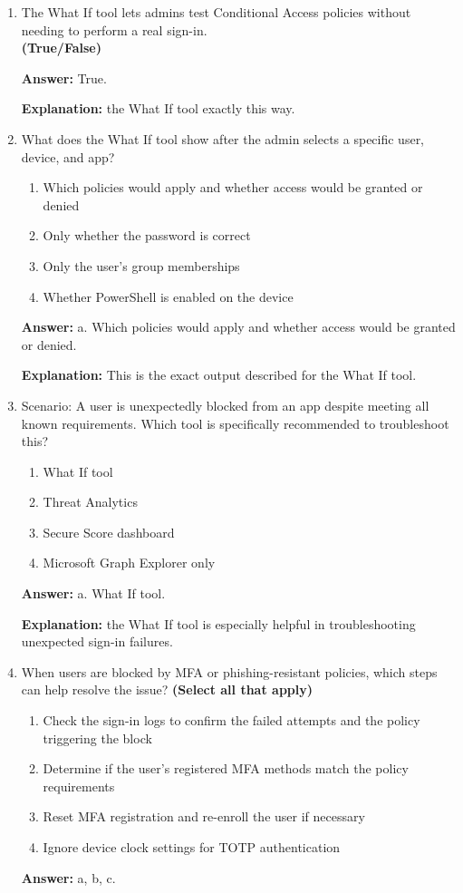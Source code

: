 \documentclass[10pt]{article}
\begin{document}
\begin{enumerate}[leftmargin=*]
\textbf{Explanation:} These are the exact common failure reasons listed in the documentation.

\item The What If tool lets admins test Conditional Access policies without\\
needing to perform a real sign-in.\\
\textbf{(True/False)}

\textbf{Answer:} True.

\textbf{Explanation:} the What If tool exactly this way.

\item What does the What If tool show after the admin selects a specific user, device, and app?
\begin{enumerate}[label=\alph*., leftmargin=1.5em]
\item Which policies would apply and whether access would be granted or denied
\item Only whether the password is correct
\item Only the user’s group memberships
\item Whether PowerShell is enabled on the device
\end{enumerate}
\textbf{Answer:} a. Which policies would apply and whether access would be granted or denied.

\textbf{Explanation:} This is the exact output described for the What If tool.

\item Scenario: A user is unexpectedly blocked from an app despite meeting all known requirements. Which tool is specifically recommended to troubleshoot this?
\begin{enumerate}[label=\alph*., leftmargin=1.5em]
\item What If tool
\item Threat Analytics
\item Secure Score dashboard
\item Microsoft Graph Explorer only
\end{enumerate}
\textbf{Answer:} a. What If tool.

\textbf{Explanation:} the What If tool is especially helpful in troubleshooting unexpected sign-in failures.

\item When users are blocked by MFA or phishing-resistant policies, which steps can help resolve the issue? \textbf{(Select all that apply)}
\begin{enumerate}[label=\alph*., leftmargin=1.5em]
\item Check the sign-in logs to confirm the failed attempts and the policy triggering the block
\item Determine if the user’s registered MFA methods match the policy requirements
\item Reset MFA registration and re-enroll the user if necessary
\item Ignore device clock settings for TOTP authentication
\end{enumerate}
\textbf{Answer:} a, b, c.


\end{enumerate}
\end{document}
